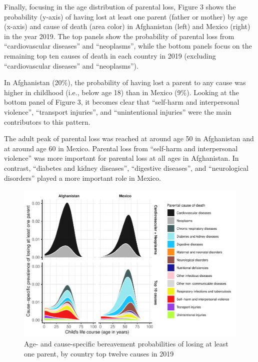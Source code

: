 \documentclass[
  11pt,
  letterpaper,
]{article}
\begin{document}
Finally, focusing in the age distribution of parental loss, Figure 3 shows the probability (y-axis) of having lost at least one parent (father or mother) by age (x-axis) and cause of death (area color) in Afghanistan (left) and Mexico (right) in the year 2019. The top panels show the probability of parental loss from ``cardiovascular diseases'' and ``neoplasms'', while the bottom panels focus on the remaining top ten causes of death in each country in 2019 (excluding ``cardiovascular diseases'' and ``neoplasms'').

In Afghanistan (20\%), the probability of having lost a parent to any cause was higher in childhood (i.e., below age 18) than in Mexico (9\%). Looking at the bottom panel of Figure 3, it becomes clear that ``self-harm and interpersonal violence'', ``transport injuries'', and ``unintentional injuries'' were the main contributors to this pattern.

The adult peak of parental loss was reached at around age 50 in Afghanistan and at around age 60 in Mexico. Parental loss from ``self-harm and interpersonal violence'' was more important for parental loss at all ages in Afghanistan. In contrast, ``diabetes and kidney diseases'', ``digestive diseases'', and ``neurological disorders'' played a more important role in Mexico.

\begin{figure}
\centering
\includegraphics{parental_loss_global_paa_ext_abstract_files/figure-latex/ber-prob-1.pdf}
\caption{\label{fig:ber-prob}Age- and cause-specific bereavement probabilities of losing at least one parent, by country top twelve causes in 2019}
\end{figure}
\end{document}

